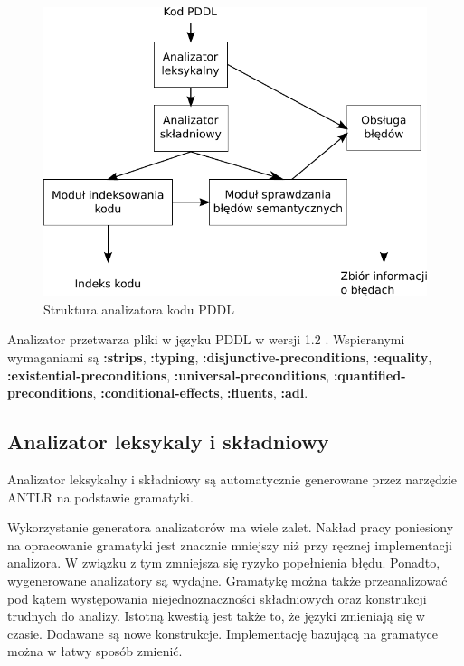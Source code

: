 \begin{figure}[h]
  \centering
    \includegraphics{img/ana_structure.pdf}
    \caption{Struktura analizatora kodu PDDL}
    \label{ana_structure}
\end{figure}

\begin{sloppypar}
Analizator przetwarza pliki w języku PDDL w wersji 1.2 \cite{pddl}. Wspieranymi wymaganiami
są \textbf{:strips}, \textbf{:typing}, \textbf{:disjunctive-preconditions}, \textbf{:equality},
\textbf{:existential-preconditions}, \textbf{:universal-preconditions}, \textbf{:quantified-preconditions},
\textbf{:conditional-effects}, \textbf{:fluents}, \textbf{:adl}.
\end{sloppypar}

\subsection{Analizator leksykaly i składniowy}
Analizator leksykalny i składniowy są automatycznie generowane przez narzędzie ANTLR
na podstawie gramatyki. 

Wykorzystanie generatora analizatorów ma wiele zalet. Nakład pracy poniesiony na
opracowanie gramatyki jest znacznie mniejszy niż przy ręcznej implementacji analizora.
W związku z tym zmniejsza się ryzyko popełnienia błędu. Ponadto, wygenerowane analizatory są 
wydajne. Gramatykę można także przeanalizować pod kątem występowania niejednoznaczności
składniowych
oraz konstrukcji trudnych do analizy. Istotną kwestią jest także to, że
języki zmieniają się w czasie. Dodawane są nowe konstrukcje. %
Implementację bazującą na gramatyce można w łatwy sposób zmienić.


